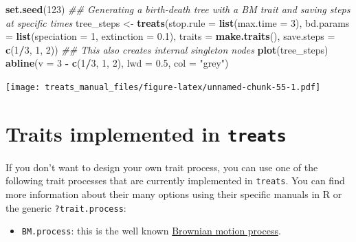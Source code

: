 \documentclass[
]{book}
\newenvironment{Shaded}{\begin{snugshade}}{\end{snugshade}}
\newcommand{\CommentTok}[1]{\textcolor[rgb]{0.56,0.35,0.01}{\textit{#1}}}
\newcommand{\DataTypeTok}[1]{\textcolor[rgb]{0.13,0.29,0.53}{#1}}
\newcommand{\DecValTok}[1]{\textcolor[rgb]{0.00,0.00,0.81}{#1}}
\newcommand{\FloatTok}[1]{\textcolor[rgb]{0.00,0.00,0.81}{#1}}
\newcommand{\KeywordTok}[1]{\textcolor[rgb]{0.13,0.29,0.53}{\textbf{#1}}}
\newcommand{\NormalTok}[1]{#1}
\newcommand{\OperatorTok}[1]{\textcolor[rgb]{0.81,0.36,0.00}{\textbf{#1}}}
\newcommand{\StringTok}[1]{\textcolor[rgb]{0.31,0.60,0.02}{#1}}
\providecommand{\tightlist}{%
  \setlength{\itemsep}{0pt}\setlength{\parskip}{0pt}}
\begin{document}
\begin{Shaded}
\begin{Highlighting}[]
\KeywordTok{set.seed}\NormalTok{(}\DecValTok{123}\NormalTok{)}
\CommentTok{\#\# Generating a birth{-}death tree with a BM trait and saving steps at specific times}
\NormalTok{tree\_steps \textless{}{-}}\StringTok{ }\KeywordTok{treats}\NormalTok{(}\DataTypeTok{stop.rule  =} \KeywordTok{list}\NormalTok{(}\DataTypeTok{max.time =} \DecValTok{3}\NormalTok{),}
                   \DataTypeTok{bd.params  =} \KeywordTok{list}\NormalTok{(}\DataTypeTok{speciation =} \DecValTok{1}\NormalTok{, }\DataTypeTok{extinction =} \FloatTok{0.1}\NormalTok{),}
                   \DataTypeTok{traits     =} \KeywordTok{make.traits}\NormalTok{(),}
                   \DataTypeTok{save.steps =} \KeywordTok{c}\NormalTok{(}\DecValTok{1}\OperatorTok{/}\DecValTok{3}\NormalTok{, }\DecValTok{1}\NormalTok{, }\DecValTok{2}\NormalTok{))}
\CommentTok{\#\# This also creates internal singleton nodes}
\KeywordTok{plot}\NormalTok{(tree\_steps)}
\KeywordTok{abline}\NormalTok{(}\DataTypeTok{v =} \DecValTok{3} \OperatorTok{{-}}\StringTok{ }\KeywordTok{c}\NormalTok{(}\DecValTok{1}\OperatorTok{/}\DecValTok{3}\NormalTok{, }\DecValTok{1}\NormalTok{, }\DecValTok{2}\NormalTok{), }\DataTypeTok{lwd =} \FloatTok{0.5}\NormalTok{, }\DataTypeTok{col =} \StringTok{"grey"}\NormalTok{)}
\end{Highlighting}
\end{Shaded}

\texttt{[image: treats\_manual\_files/figure-latex/unnamed-chunk-55-1.pdf]}

\hypertarget{traits-implemented-in-treats}{%
\section{\texorpdfstring{Traits implemented in \texttt{treats}}{Traits implemented in treats}}\label{traits-implemented-in-treats}}

If you don't want to design your own trait process, you can use one of the following trait processes that are currently implemented in \texttt{treats}. You can find more information about their many options using their specific manuals in R or the generic \texttt{?trait.process}:

\begin{itemize}
\tightlist
\item
  \texttt{BM.process}: this is the well known \href{https://en.wikipedia.org/wiki/Brownian_motion}{Brownian motion process}.
\end{itemize}
\end{document}
